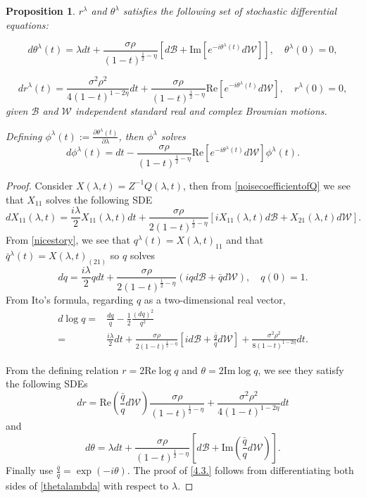 \documentclass[12pt, reqno]{amsart}
\newtheorem{proposition}[theorem]{Proposition}
\theoremstyle{definition}
\theoremstyle{remark}
\numberwithin{equation}{section}
\begin{document}
\begin{proposition}\label{whatisthesde?}
    $r^\lambda$ and $\theta^\lambda$ satisfies the following set of stochastic differential equations:

\begin{equation}\label{thetalambda}
    d\theta^\lambda(t)=\lambda dt+\frac{\sigma\rho}{(1-t)^{\frac{1}{2}-\eta}}[d\mathcal{B}+\text{Im}[e^{-i\theta^\lambda(t)}d\mathcal{W}]],\quad \theta^\lambda(0)=0,
\end{equation}

\begin{equation}
dr^\lambda(t)=\frac{\sigma^2\rho^2}{4(1-t)^{1-2\eta}}dt+\frac{\sigma\rho}{(1-t)^{\frac{1}{2}-\eta}}\text{Re}[e^{-i\theta^\lambda(t)}d\mathcal{W}],\quad r^\lambda(0)=0,
\end{equation}
given $\mathcal{B}$ and $\mathcal{W}$ independent standard real and complex Brownian motions.


Defining $\phi^\lambda(t):=\frac{\partial\theta^\lambda(t)}{\partial\lambda}$, then $\phi^\lambda$ solves
\begin{equation}\label{4.3.}
d\phi^\lambda(t)=dt-\frac{\sigma\rho}{(1-t)^{\frac{1}{2}-\eta}}\text{Re}[e^{-i\theta^\lambda(t)}d\mathcal{W}]\phi^\lambda(t).
\end{equation}
\end{proposition}
    

\begin{proof} Consider $X(\lambda,t)=Z^{-1}Q(\lambda,t)$, then from \eqref{noisecoefficientofQ} we see that
     $X_{11}$ solves the following SDE
    $$
dX_{11}(\lambda,t)=\frac{i\lambda}{2}X_{11}(\lambda,t)dt+\frac{\sigma\rho}{2(1-t)^{\frac{1}{2}-\eta}}[iX_{11}(\lambda,t)d\mathcal{B}+X_{21}(\lambda,t)d\mathcal{W}].
    $$
    From \eqref{nicestory}, we see that $q^\lambda(t)=X(\lambda,t)_{11}$ and that $\bar{q}^\lambda(t)=X(\lambda,t)_{(21)}$ so $q$ solves 
    $$dq=\frac{i\lambda}{2}qdt+\frac{\sigma\rho}{2(1-t)^{\frac{1}{2}-\eta}}(iqd\mathcal{B}+\bar{q}d\mathcal{W}),\quad q(0)=1.$$
    From Ito's formula, regarding $q$ as a two-dimensional real vector,
    $$\begin{aligned}
d\log q=&\frac{dq}{q}-\frac{1}{2}\frac{(dq)^2}{q^2}\\
=&\frac{i \lambda}{2}dt +\frac{\sigma\rho}{2(1-t)^{\frac{1}{2}-\eta}}[id\mathcal{B}+\frac{\bar{q}}{q}d\mathcal{W}]+\frac{\sigma^2\rho^2}{8(1-t)^{1-2\eta}}dt.
 \end{aligned}   $$

 From the defining relation $r=2\text{Re}\log q$ and $\theta=2\text{Im}\log q$, we see they satisfy the following SDEs
$$ dr=\text{Re}(\frac{\bar{q}}{q}d\mathcal{W})\frac{\sigma\rho}{(1-t)^{\frac{1}{2}-\eta}}+\frac{\sigma^2\rho^2}{4(1-t)^{1-2\eta}}dt$$
 and 
 $$d\theta=\lambda dt+\frac{\sigma\rho}{(1-t)^{\frac{1}{2}-\eta}}[d\mathcal{B}+\text{Im}(\frac{\bar{q}}{q}d\mathcal{W})].$$
 Finally use $\frac{\bar{q}}{q}=\exp(-i\theta).$ The proof of \eqref{4.3.} follows from differentiating both sides of \eqref{thetalambda} with respect to $\lambda$.
\end{proof}
\end{document}
